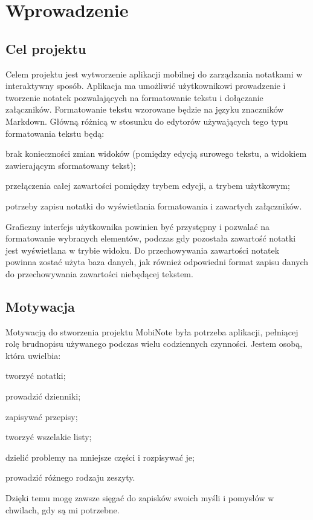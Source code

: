 \documentclass[shortabstract]{iithesis}
\author         {Bartosz Sobocki}
\begin{document}

\chapter{Wprowadzenie}

\section{Cel projektu}

Celem projektu jest wytworzenie aplikacji mobilnej do zarządzania notatkami w interaktywny sposób.
Aplikacja ma umożliwić użytkownikowi prowadzenie i tworzenie notatek pozwalających na formatowanie tekstu i dołączanie załączników.
Formatowanie tekstu wzorowane będzie na języku znaczników Markdown. Główną różnicą w stosunku do edytorów używających tego typu formatowania tekstu będą:
\begin{compactitem}
    \item brak konieczności zmian widoków (pomiędzy edycją surowego tekstu, a widokiem zawierającym sformatowany tekst);
    \item przełączenia całej zawartości pomiędzy trybem edycji, a trybem użytkowym;
    \item potrzeby zapisu notatki do wyświetlania formatowania i zawartych załączników.
\end{compactitem}

Graficzny interfejs użytkownika powinien być przystępny i pozwalać na formatowanie wybranych elementów, podczas gdy pozostała zawartość notatki jest wyświetlana w trybie widoku.
Do przechowywania zawartości notatek powinna zostać użyta baza danych, jak również odpowiedni format zapisu danych do przechowywania zawartości niebędącej tekstem.

\section{Motywacja}

Motywacją do stworzenia projektu MobiNote była potrzeba aplikacji, pełniącej rolę brudnopisu używanego podczas wielu codziennych czynności. Jestem osobą, która uwielbia:

\begin{compactitem}
    \item tworzyć notatki;
    \item prowadzić dzienniki;
    \item zapisywać przepisy;
    \item tworzyć wszelakie listy;
    \item dzielić problemy na mniejsze części i rozpisywać je;
    \item  prowadzić różnego rodzaju zeszyty.
\end{compactitem}
Dzięki temu mogę zawsze sięgać do zapisków swoich myśli i pomysłów w chwilach, gdy są mi potrzebne.
\end{document}
